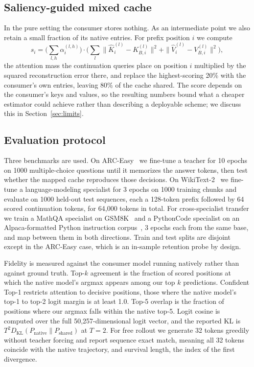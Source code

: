 \documentclass[11pt]{article}
\begin{document}
\subsection{Saliency-guided mixed cache}

In the pure setting the consumer stores nothing. As an intermediate point we also retain a
small fraction of its native entries. For prefix position $i$ we compute
\[
  s_i = \Big(\textstyle\sum_{l,h}\alpha^{(l,h)}_i\Big) \cdot
        \Big(\textstyle\sum_{l} \|\hat{K}^{(l)}_i - K^{(l)}_{B,i}\|^2 + \|\hat{V}^{(l)}_i - V^{(l)}_{B,i}\|^2\Big),
\]
the attention mass the continuation queries place on position $i$ multiplied by the squared
reconstruction error there, and replace the highest-scoring 20\% with the consumer's own
entries, leaving 80\% of the cache shared. The score depends on the consumer's keys and
values, so the resulting numbers bound what a cheaper estimator could achieve rather than
describing a deployable scheme; we discuss this in Section~\ref{sec:limits}.

\subsection{Evaluation protocol}

Three benchmarks are used. On ARC-Easy~\cite{clark2018arc} we fine-tune a teacher for 10
epochs on 1000 multiple-choice questions until it memorizes the answer tokens, then test
whether the mapped cache reproduces those decisions. On WikiText-2~\cite{merity2017pointer}
we fine-tune a language-modeling specialist for 3 epochs on 1000 training chunks and
evaluate on 1000 held-out test sequences, each a 128-token prefix followed by 64 scored
continuation tokens, for 64{,}000 tokens in total. For cross-specialist transfer we train a
MathQA specialist on GSM8K~\cite{cobbe2021gsm8k} and a PythonCode specialist on an
Alpaca-formatted Python instruction corpus~\cite{tarun2023pythoncode}, 3 epochs each from
the same base, and map between them in both directions. Train and test splits are disjoint
except in the ARC-Easy case, which is an in-sample retention probe by design.

Fidelity is measured against the consumer model running natively rather than against ground
truth. Top-$k$ agreement is the fraction of scored positions at which the native model's
argmax appears among our top $k$ predictions. Confident Top-1 restricts attention to
decisive positions, those where the native model's top-1 to top-2 logit margin is at least
1.0. Top-5 overlap is the fraction of positions where our argmax falls within the native
top-5. Logit cosine is computed over the full 50{,}257-dimensional logit vector, and the
reported KL is $T^2 D_{\mathrm{KL}}(P_{\text{native}} \| P_{\text{shared}})$ at $T = 2$. For
free rollout we generate 32 tokens greedily without teacher forcing and report sequence
exact match, meaning all 32 tokens coincide with the native trajectory, and survival length,
the index of the first divergence.
\end{document}
